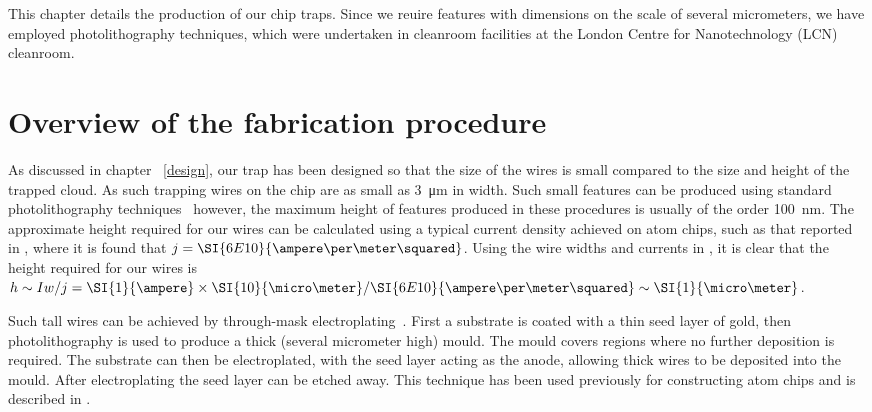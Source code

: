This chapter details the production of our chip traps. Since we reuire features
with dimensions on the scale of several micrometers, we have employed
photolithography techniques, which were undertaken in cleanroom facilities at
the London Centre for Nanotechnology (LCN) cleanroom. 

\section{Overview of the fabrication procedure}

As discussed in chapter ~\ref{design}, our trap has been designed so that the size of the wires is small compared to
the size and height of the trapped cloud. As such trapping wires on the chip
are as small as \SI{3}{\micro\meter} in width. Such small features can be
produced using standard photolithography techniques~\cite{Madou2002} however,
the maximum height of features produced in these procedures is usually of the
order \SI{100}{\nano\meter}.
%
The approximate height required for our wires can be calculated using a  typical
current density achieved on atom chips, such as that reported in
, where it is found that
$j=\SI{6E10}{\ampere\per\meter\squared}$. Using the wire widths and currents in
, it is clear that the height required for our
wires is $h \sim I w/j = \SI{1}{\ampere} \times
\SI{10}{\micro\meter}/\SI{6E10}{\ampere\per\meter\squared} \sim
\SI{1}{\micro\meter}$.

Such tall wires can be achieved by through-mask electroplating~\cite{Ruythooren_2000}.
First a substrate is coated with a thin seed layer of gold, then
photolithography is used to produce a thick (several micrometer high) mould.
The mould covers regions where no further deposition is required. The substrate
can then be electroplated, with the seed layer acting as the anode, allowing
thick wires to be deposited into the mould.  After electroplating the seed
layer can be etched away. This technique has been used previously for
constructing atom chips and is described in .

